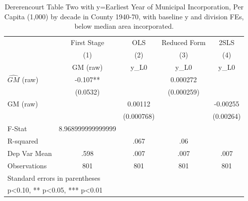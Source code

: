 \begin{table}[htbp]\centering
\def\sym#1{\ifmmode^{#1}\else\(^{#1}\)\fi}
\caption{Dererencourt Table Two with y=Earliest Year of Municipal Incorporation, Per Capita (1,000) by decade in County 1940-70, with baseline y and division FEs, below median area incorporated.}
\begin{tabular}{l*{4}{c}}
\toprule
                    & First Stage   &         OLS   &Reduced Form   &        2SLS   \\
                    &\multicolumn{1}{c}{(1)}&\multicolumn{1}{c}{(2)}&\multicolumn{1}{c}{(3)}&\multicolumn{1}{c}{(4)}\\
                    &\multicolumn{1}{c}{GM  (raw)}&\multicolumn{1}{c}{y\_L0}&\multicolumn{1}{c}{y\_L0}&\multicolumn{1}{c}{y\_L0}\\
\midrule
$\hat{GM}$ (raw)    &      -0.107** &               &    0.000272   &               \\
                    &    (0.0532)   &               &  (0.000259)   &               \\
\addlinespace
GM  (raw)           &               &     0.00112   &               &    -0.00255   \\
                    &               &  (0.000768)   &               &   (0.00264)   \\
\midrule
F-Stat              &8.968999999999999   &               &               &               \\
R-squared           &               &        .067   &         .06   &               \\
Dep Var Mean        &        .598   &        .007   &        .007   &        .007   \\
Observations        &         801   &         801   &         801   &         801   \\
\bottomrule
\multicolumn{5}{l}{\footnotesize Standard errors in parentheses}\\
\multicolumn{5}{l}{\footnotesize * p<0.10, ** p<0.05, *** p<0.01}\\
\end{tabular}
\end{table}
